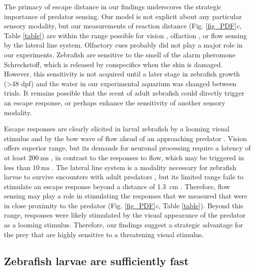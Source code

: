 \documentclass[]{rsos}%
\begin{document}
The primacy of escape distance in our findings underscores the strategic importance of predator sensing. 
Our model is not explicit about any particular sensory modality, but our measurements of reaction distance (Fig. \ref{fig_PDF}\textit{c}, Table \ref{table}) are within the range possible for vision \cite{Dunn:2016jt}, olfaction \cite{Waldman:1982ic}, or flow sensing by the lateral line system.
Olfactory cues probably did not play a major role in our experiments. 
Zebrafish are sensitive to the smell of the alarm pheromone Schreckstoff, which is released by conspecifics when the skin is damaged. 
However, this sensitivity is not acquired until a later stage in zebrafish growth (>48 dpf) \cite{Waldman:1982ic} and the water in our experimental aquarium was changed between trials.
It remains possible that the scent of adult zebrafish could directly trigger an escape response, or perhaps enhance the sensitivity of another sensory modality.

Escape responses are clearly elicited in larval zebrafish by a looming visual stimulus \cite{Bianco:2011ca} and by the bow wave of flow ahead of an approaching predator \cite{Stewart:2014cma}.
Vision offers superior range, but its demands for neuronal processing require a latency of at least $\SI{200}{\ms}$ \cite{Burgess:2007vp}, in contrast to the responses to flow, which may be triggered in less than $\SI{10}{\ms}$  \cite{Liu:1999fs}.
The lateral line system is a modality necessary for zebrafish larvae to survive encounters with adult predators \cite{Stewart:2013bha}, but its limited range fails to stimulate an escape response beyond a distance of \SI{1.3}{\cm} \cite{Stewart:2014cma}.
Therefore, flow sensing may play a role in stimulating the responses that we measured that were in close proximity to the predator (Fig. \ref{fig_PDF}\textit{c}, Table \ref{table}).
Beyond this range, responses were likely stimulated by the visual appearance of the predator as a looming stimulus. 
Therefore, our findings suggest a strategic advantage for the prey that are highly sensitive to a threatening visual stimulus. 

\subsection{Zebrafish larvae are sufficiently fast} 
\end{document}
